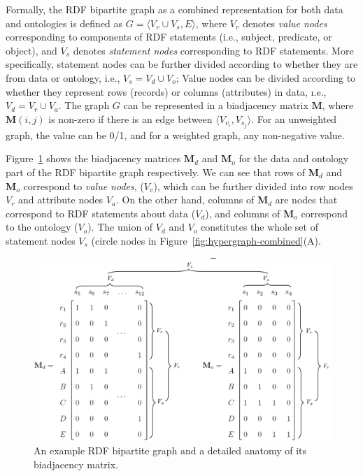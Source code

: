 Formally, the RDF bipartite graph as a combined representation for both data and ontologies is defined as $G=\langle V_v \cup V_s, E \rangle$, where $V_v$ denotes \emph{value nodes} corresponding to components of RDF statements (i.e., subject, predicate, or object), and $V_s$ denotes \emph{statement nodes} corresponding to RDF statements. More specifically, statement nodes can be further divided according to whether they are from data or ontology, i.e., $V_s=V_d \cup V_o$; Value nodes can be divided according to whether they represent rows (records) or columns (attributes) in data, \i.e., $V_d=V_r \cup V_a$. The graph $G$ can be represented in a biadjacency matrix $\mathbf{M}$, where $\mathbf{M}(i,j)$ is non-zero if there is an edge between $\langle V_{v_i}, V_{s_j} \rangle$. For an unweighted graph, the value can be 0/1, and for a weighted graph, any non-negative value.
 
Figure~\ref{fig:biadjacency-matrices} shows the biadjacency matrices $\mathbf{M}_d$ and $\mathbf{M}_o$ for the data and ontology part of the RDF bipartite graph respectively. We can see that rows of $\mathbf{M}_d$ and $\mathbf{M}_o$ correspond to \emph{value nodes}, ($V_v$), which can be further divided into row nodes $V_r$ and attribute nodes $V_a$. On the other hand, columns of $\mathbf{M}_d$ are nodes that correspond to RDF statements about data ($V_d$), and columns of $\mathbf{M}_o$ correspond to the ontology ($V_o$). The union of $V_d$ and $V_o$ constitutes the whole set of statement nodes $V_s$ (circle nodes in Figure~\ref{fig:hypergraph-combined}(A).

\begin{figure}[h!t]
\begin{center}
\includegraphics[width=.7\textwidth]{fig/biadjacency-matrices.eps}
\end{center}
\caption[An example RDF bipartite graph and a detailed anatomy of\protect\newline its biadjacency matrix]{\label{fig:biadjacency-matrices} An example RDF bipartite graph and a detailed anatomy of its biadjacency matrix.}
\end{figure}


